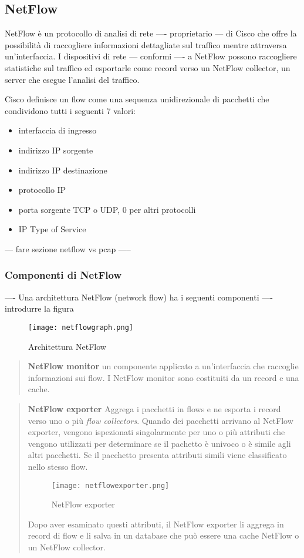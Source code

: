 \documentclass[../main.tex]{subfiles}
\begin{document}
\subsection{NetFlow}
NetFlow è un protocollo di analisi di rete ---- proprietario --- di Cisco che offre la possibilità di raccogliere informazioni dettagliate sul traffico mentre attraversa un'interfaccia. I dispositivi di rete --- conformi ---- a NetFlow possono raccogliere statistiche sul traffico ed esportarle come record verso un NetFlow collector, un server che esegue l'analisi del traffico.

Cisco definisce un flow come una sequenza unidirezionale di pacchetti che condividono tutti i seguenti 7 valori:

\begin{itemize}
				\item interfaccia di ingresso
				\item indirizzo IP sorgente
				\item indirizzo IP destinazione
				\item protocollo IP
				\item porta sorgente TCP o UDP, 0 per altri protocolli
				\item IP Type of Service
\end{itemize}


--- fare sezione netflow vs pcap -----

\subsubsection{Componenti di NetFlow}
---- Una architettura NetFlow (network flow) ha i seguenti componenti ----
introdurre la figura

\begin{figure}[H]
\centering
\texttt{[image: netflowgraph.png]}
\caption{Architettura NetFlow}
\end{figure}

\begin{verse}
\textbf{NetFlow monitor}
un componente applicato a un'interfaccia che raccoglie informazioni sui flow. I NetFlow monitor sono costituiti da un record e una cache.
\end{verse}

\begin{verse}
\textbf{NetFlow exporter}
Aggrega i pacchetti in flows e ne esporta i record verso uno o più \textit{flow collectors}.
Quando dei pacchetti arrivano al NetFlow exporter, vengono ispezionati singolarmente per uno o più attributi che vengono utilizzati per determinare se il pachetto è univoco o è simile agli altri pacchetti. Se il pacchetto presenta attributi simili viene classificato nello stesso flow.


\begin{figure}[H]
\centering
\texttt{[image: netflowexporter.png]}
\caption{NetFlow exporter}
\end{figure}

Dopo aver esaminato questi attributi, il NetFlow exporter li aggrega in record di flow e li salva in un database che può essere una cache NetFlow o un NetFlow collector.
\end{verse}
\end{document}

